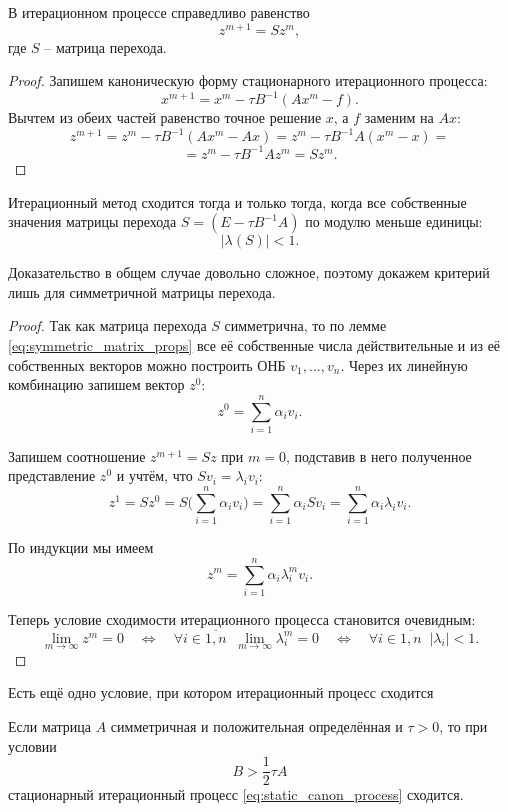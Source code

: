 \documentclass{article}
\begin{document}
\begin{lemma}
	В итерационном процессе справедливо равенство
	\[z^{m+1}=Sz^m,\]
	где $S$ -- матрица перехода.
\end{lemma}

\begin{proof}
	Запишем каноническую форму стационарного итерационного процесса:
	\[x^{m+1}=x^m-\tau B^{-1}(Ax^m-f).\]
	Вычтем из обеих частей равенство точное решение $x$, а $f$ заменим на
	$Ax$:
	\[z^{m+1}=z^m-\tau B^{-1}(Ax^m-Ax)=z^m-\tau B^{-1}A(x^m-x)=\]
	\[=z^m-\tau B^{-1}Az^m=Sz^m.\]
\end{proof}

\begin{theorem}
	Итерационный метод сходится тогда и только тогда, когда все собственные
	значения матрицы перехода $S=(E-\tau B^{-1}A)$ по модулю меньше единицы:
	\[|\lambda (S)|<1.\]
\end{theorem}

Доказательство в общем случае довольно сложное, поэтому докажем критерий лишь
для симметричной матрицы перехода.

\newpage

\begin{proof}
	Так как матрица перехода $S$ симметрична, то по лемме
	\eqref{eq:symmetric_matrix_props} все её собственные числа
	действительные и из её собственных векторов можно построить ОНБ
	$v_1,...,v_n$. Через их линейную комбинацию запишем вектор $z^0$:
	\[z^0=\sum_{i=1}^{n}\alpha_iv_i.\]

	Запишем соотношение $z^{m+1}=Sz$ при $m=0$, подставив в него полученное
	представление $z^0$ и учтём, что $Sv_i=\lambda_iv_i$:
	\[z^1=Sz^0=S\Big(\sum_{i=1}^{n}\alpha_iv_i\Big)=
	\sum_{i=1}^{n}\alpha_iSv_i=
	\sum_{i=1}^{n}\alpha_i\lambda_iv_i.\]

	По индукции мы имеем
	\[z^m=\sum_{i=1}^{n}\alpha_i\lambda_i^mv_i.\]

	Теперь условие сходимости итерационного процесса становится очевидным:
	\[\lim_{m\to\infty}z^m=0\quad\Leftrightarrow\quad
	\forall i\in\overline{1,n}\;\;\lim_{m\to\infty}\lambda_i^m=0\quad
	\Leftrightarrow\quad \forall i\in\overline{1,n}\;\;|\lambda_i|<1.\]
\end{proof}

Есть ещё одно условие, при котором итерационный процесс сходится

\begin{theorem}[Самарского]
	Если матрица $A$ симметричная и положительная определённая и $\tau>0$,
	то при условии
	\[B>\frac{1}{2}\tau A\]
	стационарный итерационный процесс \eqref{eq:static_canon_process}
	сходится.
\end{theorem}
\end{document}
